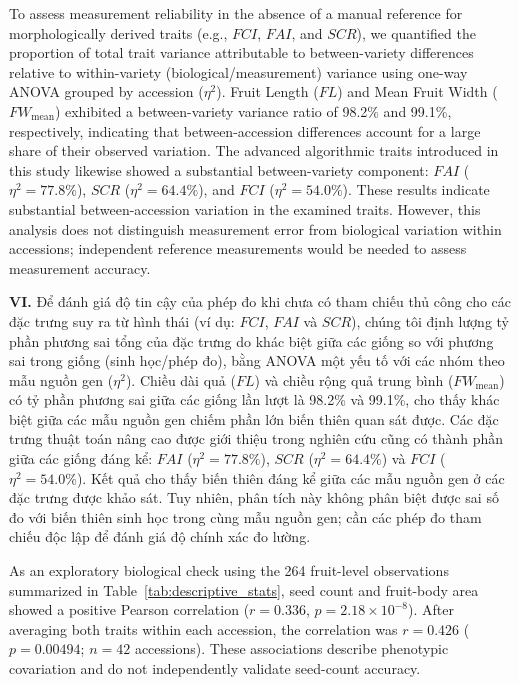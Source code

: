 \documentclass[final,1p,11pt,longtitle]{elsarticle}
\newenvironment{viet}{\par\smallskip\begingroup\color{viColor}\noindent\textbf{VI. }\ignorespaces}{\par\endgroup\smallskip}
\begin{document}
To assess measurement reliability in the absence of a manual reference for morphologically derived traits (e.g., $FCI$, $FAI$, and $SCR$), we quantified the proportion of total trait variance attributable to between-variety differences relative to within-variety (biological/measurement) variance using one-way ANOVA grouped by accession ($\eta^2$). Fruit Length ($FL$) and Mean Fruit Width ($FW_{\mathrm{mean}}$) exhibited a between-variety variance ratio of 98.2\% and 99.1\%, respectively, indicating that between-accession differences account for a large share of their observed variation. The advanced algorithmic traits introduced in this study likewise showed a substantial between-variety component: $FAI$ ($\eta^2=77.8\%$), $SCR$ ($\eta^2=64.4\%$), and $FCI$ ($\eta^2=54.0\%$). These results indicate substantial between-accession variation in the examined traits. However, this analysis does not distinguish measurement error from biological variation within accessions; independent reference measurements would be needed to assess measurement accuracy.

\begin{viet}
Để đánh giá độ tin cậy của phép đo khi chưa có tham chiếu thủ công cho các đặc trưng suy ra từ hình thái (ví dụ: $FCI$, $FAI$ và $SCR$), chúng tôi định lượng tỷ phần phương sai tổng của đặc trưng do khác biệt giữa các giống so với phương sai trong giống (sinh học/phép đo), bằng ANOVA một yếu tố với các nhóm theo mẫu nguồn gen ($\eta^2$). Chiều dài quả ($FL$) và chiều rộng quả trung bình ($FW_{\mathrm{mean}}$) có tỷ phần phương sai giữa các giống lần lượt là 98.2\% và 99.1\%, cho thấy khác biệt giữa các mẫu nguồn gen chiếm phần lớn biến thiên quan sát được. Các đặc trưng thuật toán nâng cao được giới thiệu trong nghiên cứu cũng có thành phần giữa các giống đáng kể: $FAI$ ($\eta^2=77.8\%$), $SCR$ ($\eta^2=64.4\%$) và $FCI$ ($\eta^2=54.0\%$). Kết quả cho thấy biến thiên đáng kể giữa các mẫu nguồn gen ở các đặc trưng được khảo sát. Tuy nhiên, phân tích này không phân biệt được sai số đo với biến thiên sinh học trong cùng mẫu nguồn gen; cần các phép đo tham chiếu độc lập để đánh giá độ chính xác đo lường.
\end{viet}


As an exploratory biological check using the 264 fruit-level observations summarized in Table~\ref{tab:descriptive_stats}, seed count and fruit-body area showed a positive Pearson correlation ($r=0.336$, $p=2.18\times10^{-8}$). After averaging both traits within each accession, the correlation was $r=0.426$ ($p=0.00494$; $n=42$ accessions). These associations describe phenotypic covariation and do not independently validate seed-count accuracy.
\end{document}
